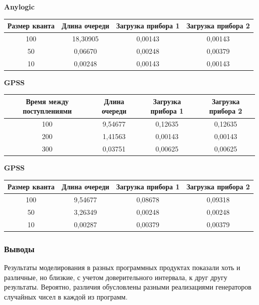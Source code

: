 \textbf{Anylogic}

\begin{adjustbox}{max width=\textwidth}
\begin{tabular}{|c|c|c|c|}
\hline
Размер кванта & Длина очереди & Загрузка прибора 1 & Загрузка прибора 2 \\ \hline
100 & 18,30905 & 0,00143 & 0,00143 \\ \hline
50 & 0,06670 & 0,00248 & 0,00379 \\ \hline
10 & 0,00248 & 0,00143 & 0,00143 \\ \hline
\end{tabular}
\end{adjustbox}
\newline
\vspace*{1 cm}
\newline

\textbf{GPSS}

\begin{adjustbox}{max width=\textwidth}
\begin{tabular}{|c|c|c|c|}
\hline
Время между поступлениями & Длина очереди & Загрузка прибора 1 & Загрузка прибора 2 \\ \hline
100 & 9,54677 & 0,12635 & 0,12635 \\ \hline
200 & 1,41563 & 0,00143 & 0,00143 \\ \hline
300 & 0,03751 & 0,00625 & 0,00625 \\ \hline
\end{tabular}
\end{adjustbox}
\newline
\vspace*{1 cm}
\newline

\textbf{GPSS}

\begin{adjustbox}{max width=\textwidth}
\begin{tabular}{|c|c|c|c|}
\hline
Размер кванта & Длина очереди & Загрузка прибора 1 & Загрузка прибора 2 \\ \hline
100 & 9,54677 & 0,08678 & 0,09318 \\ \hline
50 & 3,26349 & 0,00248 & 0,00248 \\ \hline
10 & 0,00287 & 0,00379 & 0,00379 \\ \hline
\end{tabular}
\end{adjustbox}

\subsubsection{Выводы}
Результаты моделирования в разных программных продуктах показали хоть и различные,
но близкие, с учетом доверительного интервала, к друг другу результаты.
Вероятно, различия обусловлены разными реализациями генераторов случайных чисел
в каждой из программ.

